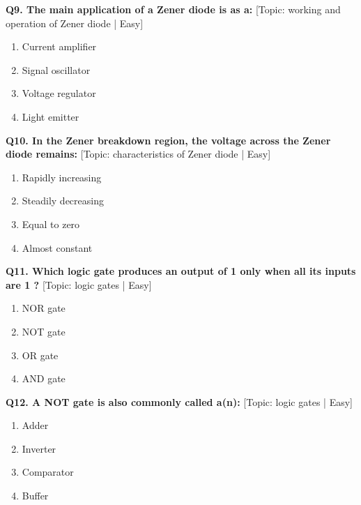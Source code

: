 \noindent\textbf{Q9. The main application of a Zener diode is as a:} \hfill [Topic: working and operation of Zener diode | Easy]
\begin{enumerate}[label=(\alph*),topsep=2pt,itemsep=1pt,partopsep=0pt,parsep=0pt]
    \item {Current amplifier}
    \item {Signal oscillator}
    \item {Voltage regulator}
    \item {Light emitter}
\end{enumerate}
\vspace{2mm}

\noindent\textbf{Q10. In the Zener breakdown region, the voltage across the Zener diode remains:} \hfill [Topic: characteristics of Zener diode | Easy]
\begin{enumerate}[label=(\alph*),topsep=2pt,itemsep=1pt,partopsep=0pt,parsep=0pt]
    \item {Rapidly increasing}
    \item {Steadily decreasing}
    \item {Equal to zero}
    \item {Almost constant}
\end{enumerate}
\vspace{2mm}

\noindent\textbf{Q11. Which logic gate produces an output of 1 only when all its inputs are 1 ?} \hfill [Topic: logic gates | Easy]
\begin{enumerate}[label=(\alph*),topsep=2pt,itemsep=1pt,partopsep=0pt,parsep=0pt]
    \item {NOR gate}
    \item {NOT gate}
    \item {OR gate}
    \item {AND gate}
\end{enumerate}
\vspace{2mm}

\noindent\textbf{Q12. A NOT gate is also commonly called a(n):} \hfill [Topic: logic gates | Easy]
\begin{enumerate}[label=(\alph*),topsep=2pt,itemsep=1pt,partopsep=0pt,parsep=0pt]
    \item {Adder}
    \item {Inverter}
    \item {Comparator}
    \item {Buffer}
\end{enumerate}
\vspace{2mm}

